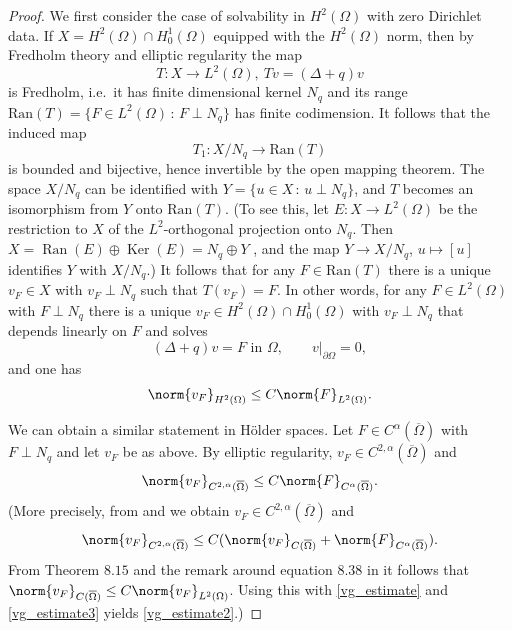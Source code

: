 \documentclass[11pt,a4paper]{amsart}
\theoremstyle{definition}
\numberwithin{equation}{section}
\newcommand{\ol}[1]{\overline{#1}}
\newcommand{\p}{\partial}
\newcommand{\Om}{\Omega}
\begin{document}
\begin{proof}
We first consider the case of solvability in $H^2(\Om)$ with zero Dirichlet data. If $X = H^2(\Om) \cap H^1_0(\Om)$ equipped with the $H^2(\Om)$ norm, then by Fredholm theory \cite[Theorem 4 in Section 6.2.3]{Evans} and elliptic regularity \cite[Theorem 4 in Section 6.3.2]{Evans} the map 
\[
T: X \to L^2(\Om), \ Tv = (\Delta+q)v
\]
is Fredholm, i.e.\ it has finite dimensional kernel $N_q$ and its range $\mathrm{Ran}(T) = \{ F \in L^2(\Om) \,:\, F \perp N_q \}$ has finite codimension. It follows that the induced map 
\[
T_1: X/N_q \to \mathrm{Ran}(T)
\]
is bounded and bijective, hence invertible by the open mapping theorem. The space $X/N_q$ can be identified with $Y = \{ u \in X \,:\, u \perp N_q \}$, and $T$ becomes an isomorphism from $Y$ onto $\mathrm{Ran}(T)$. (To see this, let $E: X\to L^2(\Omega)$ be the restriction to $X$ of the $L^2$-orthogonal projection onto $N_q$. Then $X = \operatorname{Ran}(E) \oplus \operatorname{Ker}(E) = N_q \oplus Y$ \cite[Theorem 13.2 b)]{conway}, and the map $Y \to X/N_q$, $u \mapsto [u]$ identifies $Y$ with $X/N_q$.) It follows that for any $F \in \mathrm{Ran}(T)$ there is a unique $v_F \in X$ with $v_F \perp N_q$ such that $T(v_F) = F$. In other words, for any $F \in L^2(\Om)$ with $F \perp N_q$ there is a unique $v_F \in H^2(\Om) \cap H^1_0(\Om)$ with $v_F \perp N_q$ that depends linearly on $F$ and solves 
\[
(\Delta+q)v = F \text{ in $\Om$}, \qquad v|_{\p \Om} = 0,
\]
and one has 
\begin{equation} \label{vg_estimate}
\norm{v_F}_{H^2(\Om)} \leq C \norm{F}_{L^2(\Om)}.
\end{equation}

We can obtain a similar statement in H\"older spaces. Let $F \in C^{\alpha}(\ol{\Om})$ with $F \perp N_q$ and let $v_F$ be as above. By elliptic regularity, $v_F \in C^{2,\alpha}(\ol{\Om})$ and
\begin{equation} \label{vg_estimate2}
\norm{v_F}_{C^{2,\alpha}(\ol{\Om})} \leq C \norm{F}_{C^{\alpha}(\ol{\Om})}.
\end{equation}
(More precisely, from \cite[Theorem 2.2]{browder62} and \cite[Lemma 6.18 and Problem 6.2]{GT} we obtain $v_F \in C^{2,\alpha}(\ol{\Om})$ and
\begin{equation}\label{vg_estimate3}
\norm{v_F}_{C^{2,\alpha}(\ol{\Om})} \leq C(\norm{v_F}_{C(\ol{\Om})} + \norm{F}_{C^{\alpha}(\ol{\Om})}).
\end{equation}
From Theorem $8.15$ and the remark around equation $8.38$ in \cite{GT} it follows that $\norm{v_F}_{C(\ol{\Om})} \leq C\norm{v_F}_{L^2(\Om)}$. Using this with \eqref{vg_estimate} and \eqref{vg_estimate3} yields \eqref{vg_estimate2}.)



\end{proof}
\end{document}
